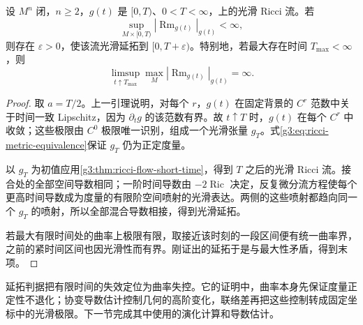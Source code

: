 \begin{theorem}\label{g3:thm:ricci-flow-curvature-continuation}
 设 \(M^n\) 闭，\(n\ge2\)，\(g(t)\) 是 \([0,T)\)、\(0<T<\infty\)，上的光滑 Ricci 流。若
 \[
  \sup_{M\times[0,T)}|\operatorname{Rm}_{g(t)}|_{g(t)}<\infty,
 \]
 则存在 \(\varepsilon>0\)，使该流光滑延拓到 \([0,T+\varepsilon)\)。特别地，若最大存在时间 \(T_{\max}<\infty\)，则
 \[
  \limsup_{t\uparrow T_{\max}}
     \max_M|\operatorname{Rm}_{g(t)}|_{g(t)}=\infty.
 \]
\end{theorem}
\begin{proof}
 取 \(a=T/2\)。上一引理说明，对每个 \(r\)，\(g(t)\) 在固定背景的 \(C^r\) 范数中关于时间一致 Lipschitz，因为 \(\partial_tg\) 的该范数有界。故 \(t\uparrow T\) 时，\(g(t)\) 在每个 \(C^r\) 中收敛；这些极限由 \(C^0\) 极限唯一识别，组成一个光滑张量 \(g_T\)。式\eqref{g3:eq:ricci-metric-equivalence}保证 \(g_T\) 仍为正定度量。

 以 \(g_T\) 为初值应用\cref{g3:thm:ricci-flow-short-time}，得到 \(T\) 之后的光滑 Ricci 流。接合处的全部空间导数相同；一阶时间导数由 \(-2\operatorname{Ric}\) 决定，反复微分流方程使每个更高时间导数成为度量的有限阶空间喷射的光滑表达。两侧的这些喷射都趋向同一个 \(g_T\) 的喷射，所以全部混合导数相接，得到光滑延拓。

 若最大有限时间处的曲率上极限有限，取接近该时刻的一段区间便有统一曲率界，之前的紧时间区间也因光滑性而有界。刚证出的延拓于是与最大性矛盾，得到末项。
\end{proof}

延拓判据把有限时间的失效定位为曲率失控。它的证明中，曲率本身先保证度量正定性不退化；协变导数估计控制几何的高阶变化，联络差再把这些控制转成固定坐标中的光滑极限。下一节完成其中使用的演化计算和导数估计。
